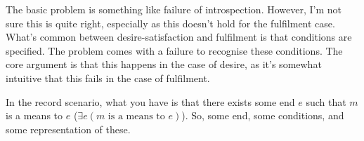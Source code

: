 \documentclass[10pt]{article}
\begin{document}
The basic problem is something like failure of introspection.
However, I'm not sure this is quite right, especially as this doesn't hold for the fulfilment case.
What's common between desire-satisfaction and fulfilment is that conditions are specified.
The problem comes with a failure to recognise these conditions.
The core argument is that this happens in the case of desire, as it's somewhat intuitive that this fails in the case of fulfilment.

In the record scenario, what you have is that there exists some end \(e\) such that \(m\) is a means to \(e\) (\(\exists e (m \text{ is a means to } e)\)).
So, some end, some conditions, and some representation of these.


\newpage
\printbibliography
\end{document}
